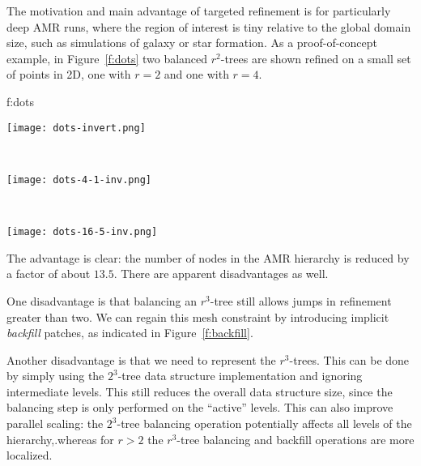 \documentclass[10pt]{article}
\begin{document}
The motivation and main advantage of targeted refinement is for
particularly deep AMR runs, where the region of interest is tiny
relative to the global domain size, such as simulations of galaxy or
star formation.  As a proof-of-concept example, in Figure~\ref{f:dots}
two balanced $r^2$-trees are shown refined on a small set of points in 2D, one
with $r=2$ and one with $r=4$.

{f:dots}{
\begin{minipage}{7.0in}
\begin{minipage}{2.2in}
\texttt{[image: dots-invert.png]}
\end{minipage} \ 
\begin{minipage}{2.2in}
\texttt{[image: dots-4-1-inv.png]}
\end{minipage} \ 
\begin{minipage}{2.2in}
\texttt{[image: dots-16-5-inv.png]}
\end{minipage}
\end{minipage}}

The advantage is clear: the number of nodes in the AMR hierarchy is
reduced by a factor of about $13.5$.  There are apparent disadvantages
as well.

One disadvantage is that balancing an $r^3$-tree still allows jumps in
refinement greater than two.  We can regain this mesh constraint by
introducing implicit \textit{backfill} patches, as indicated in
Figure~\ref{f:backfill}.


Another disadvantage is that we need to represent the $r^3$-trees.
This can be done by simply using the $2^3$-tree data structure
implementation and ignoring intermediate levels.  This still reduces
the overall data structure size, since the balancing step is only
performed on the ``active'' levels.  This can also improve parallel
scaling: the $2^3$-tree balancing operation potentially affects all
levels of the hierarchy,.whereas for $r>2$ the $r^3$-tree balancing
and backfill operations are more localized.
\end{document}
